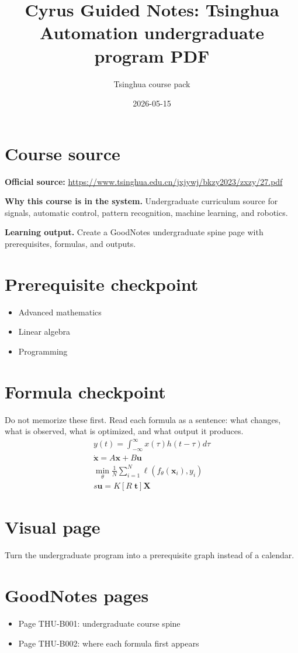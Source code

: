 \documentclass[11pt]{article}
\title{Cyrus Guided Notes: Tsinghua Automation undergraduate program PDF}
\author{Tsinghua course pack}
\date{2026-05-15}
\begin{document}
\maketitle

\section*{Course source}
\textbf{Official source:} \url{https://www.tsinghua.edu.cn/jxjywj/bkzy2023/zxzy/27.pdf}

\textbf{Why this course is in the system.} Undergraduate curriculum source for signals, automatic control, pattern recognition, machine learning, and robotics.

\textbf{Learning output.} Create a GoodNotes undergraduate spine page with prerequisites, formulas, and outputs.

\section*{Prerequisite checkpoint}
\begin{itemize}[leftmargin=1.4em]
  \item Advanced mathematics
  \item Linear algebra
  \item Programming
\end{itemize}

\section*{Formula checkpoint}
Do not memorize these first. Read each formula as a sentence: what changes, what is observed, what is optimized, and what output it produces.
\begin{align*}
  y(t)=\int_{-\infty}^{\infty}x(\tau)h(t-\tau)d\tau\\
  \dot{\bm{x}}=A\bm{x}+B\bm{u}\\
  \min_{\theta}\frac{1}{N}\sum_{i=1}^{N}\ell(f_{\theta}(\bm{x}_i),y_i)\\
  s\bm{u}=K[R\;\bm{t}]\bm{X}
\end{align*}

\section*{Visual page}
Turn the undergraduate program into a prerequisite graph instead of a calendar.

\section*{GoodNotes pages}
\begin{itemize}[leftmargin=1.4em]
  \item Page THU-B001: undergraduate course spine
  \item Page THU-B002: where each formula first appears
\end{itemize}
\end{document}
